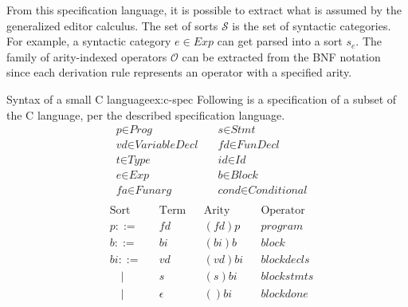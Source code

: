 From this specification language, it is possible to extract what is assumed by the generalized editor calculus\cite{aalborg}. The set of sorts $\mathcal{S}$ is the set of syntactic categories. For example, a syntactic category $e \in Exp$ can get parsed into a sort $s_{e}$.
The family of arity-indexed operators $\mathcal{O}$ can be extracted from the BNF notation since each derivation rule represents an operator with a specified arity.

\begin{example}{Syntax of a small C language}{ex:c-spec}
  Following is a specification of a subset of the C language\cite{c-iso-standard}, per the described specification language.
  \[
    \begin{aligned}
       & \textit{p}         \in \textit{Prog}           \quad & \textit{s}           \in \textit{Stmt}      \\
       & \textit{vd}        \in \textit{VariableDecl}   \quad & \textit{fd}        \in \textit{FunDecl}     \\
       & \textit{t}         \in \textit{Type}           \quad & \textit{id}          \in \textit{Id}        \\
       & \textit{e}         \in \textit{Exp}            \quad & \textit{b}           \in \textit{Block}     \\
       & \textit{fa}        \in \textit{Funarg}         \quad & \textit{cond}      \in \textit{Conditional} \\
    \end{aligned}
  \]
  \[
    \begin{aligned}
       & \text{Sort}     &  & \text{Term}                                            &  & \text{Arity}                  &  & \text{Operator}      \\
       & p ::=           &  & \textit{fd}                                            &  & (fd)p                         &  & program              \\
       & b ::=           &  & \text{$bi$}                                            &  & (bi)b                         &  & block                \\
       & bi ::=          &  & \text{$vd$}                                            &  & (vd)bi                        &  & blockdecls           \\
       & \quad |         &  & \text{$s$}                                             &  & (s)bi                         &  & blockstmts           \\
       & \quad |         &  & \epsilon                                               &  & ()bi                          &  & blockdone            \\

\end{aligned}\]
\end{example}
